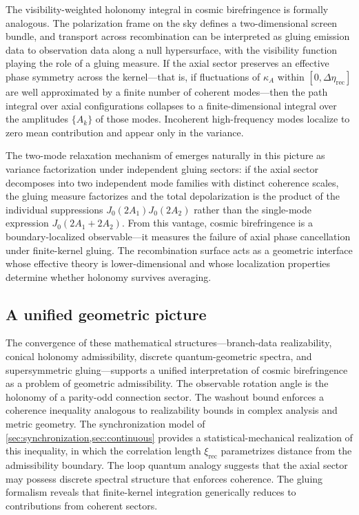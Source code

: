 \documentclass[12pt]{article}
\theoremstyle{definition}
\newcommand{\kA}{\kappa_A}
\newcommand{\Wrec}{\Delta\eta_{\mathrm{rec}}}
\newcommand{\xirec}{\xi_{\mathrm{rec}}}
\begin{document}
The visibility-weighted holonomy integral in cosmic birefringence is formally analogous. The polarization frame on the sky defines a two-dimensional screen bundle, and transport across recombination can be interpreted as gluing emission data to observation data along a null hypersurface, with the visibility function playing the role of a gluing measure. If the axial sector preserves an effective phase symmetry across the kernel---that is, if fluctuations of $\kA$ within $[0,\Wrec]$ are well approximated by a finite number of coherent modes---then the path integral over axial configurations collapses to a finite-dimensional integral over the amplitudes $\{A_k\}$ of those modes. Incoherent high-frequency modes localize to zero mean contribution and appear only in the variance.

The two-mode relaxation mechanism of \cite{ShaoObataZhang2025} emerges naturally in this picture as variance factorization under independent gluing sectors: if the axial sector decomposes into two independent mode families with distinct coherence scales, the gluing measure factorizes and the total depolarization is the product of the individual suppressions $J_0(2A_1)J_0(2A_2)$ rather than the single-mode expression $J_0(2A_1+2A_2)$. From this vantage, cosmic birefringence is a boundary-localized observable---it measures the failure of axial phase cancellation under finite-kernel gluing. The recombination surface acts as a geometric interface whose effective theory is lower-dimensional and whose localization properties determine whether holonomy survives averaging.

\subsection{A unified geometric picture}

The convergence of these mathematical structures---branch-data realizability, conical holonomy admissibility, discrete quantum-geometric spectra, and supersymmetric gluing---supports a unified interpretation of cosmic birefringence as a problem of geometric admissibility. The observable rotation angle is the holonomy of a parity-odd connection sector. The washout bound enforces a coherence inequality analogous to realizability bounds in complex analysis and metric geometry. The synchronization model of \cref{sec:synchronization,sec:continuous} provides a statistical-mechanical realization of this inequality, in which the correlation length $\xirec$ parametrizes distance from the admissibility boundary. The loop quantum analogy suggests that the axial sector may possess discrete spectral structure that enforces coherence. The gluing formalism reveals that finite-kernel integration generically reduces to contributions from coherent sectors.
\end{document}

